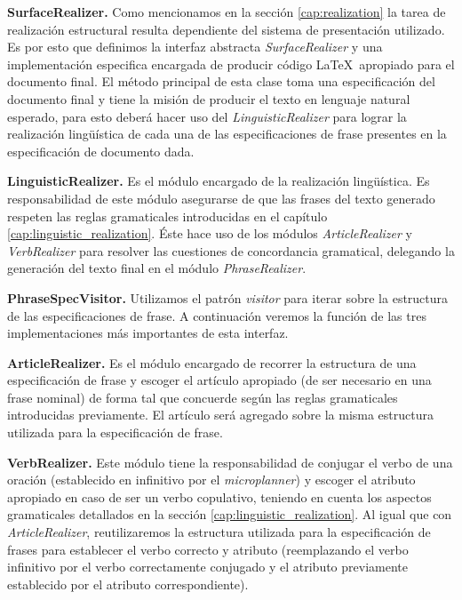 \bigskip
\noindent
\textbf{SurfaceRealizer.} Como mencionamos en la sección \ref{cap:realization} la tarea de realización estructural resulta dependiente del sistema de presentación utilizado. Es por esto que definimos la interfaz abstracta \textit{SurfaceRealizer} y una implementación especifica encargada de producir código \LaTeX~apropiado para el documento final. El método principal de esta clase toma una especificación del documento final y tiene la misión de producir el texto en lenguaje natural esperado, para esto deberá hacer uso del \textit{LinguisticRealizer} para lograr la realización lingüística de cada una de las especificaciones de frase presentes en la especificación de documento dada. 


\bigskip
\noindent
\textbf{LinguisticRealizer.} Es el módulo encargado de la realización lingüística. Es responsabilidad de este módulo asegurarse de que las frases del texto generado respeten las reglas gramaticales introducidas en el capítulo \ref{cap:linguistic_realization}. Éste hace uso de los módulos \textit{ArticleRealizer} y \textit{VerbRealizer} para resolver las cuestiones de concordancia gramatical, delegando la generación del texto final en el módulo \textit{PhraseRealizer}. 

\bigskip
\noindent
\textbf{PhraseSpecVisitor.} Utilizamos el patrón \textit{visitor} para iterar sobre la estructura de las especificaciones de frase. A continuación veremos la función de las tres implementaciones más importantes de esta interfaz. 

\bigskip
\noindent
\textbf{ArticleRealizer.} Es el módulo encargado de recorrer la estructura de una especificación de frase y escoger el artículo apropiado (de ser necesario en una frase nominal) de forma tal que concuerde según las reglas gramaticales introducidas previamente. El artículo será agregado sobre la misma estructura utilizada para la especificación de frase.

\bigskip
\noindent
\textbf{VerbRealizer.} Este módulo tiene la responsabilidad de conjugar el verbo de una oración (establecido en infinitivo por el \textit{microplanner}) y escoger el atributo apropiado en caso de ser un verbo copulativo, teniendo en cuenta los aspectos gramaticales detallados en la sección \ref{cap:linguistic_realization}. Al igual que con \textit{ArticleRealizer}, reutilizaremos la estructura utilizada para la especificación de frases para establecer el verbo correcto y atributo (reemplazando el verbo infinitivo por el verbo correctamente conjugado y el atributo previamente establecido por el atributo correspondiente).

